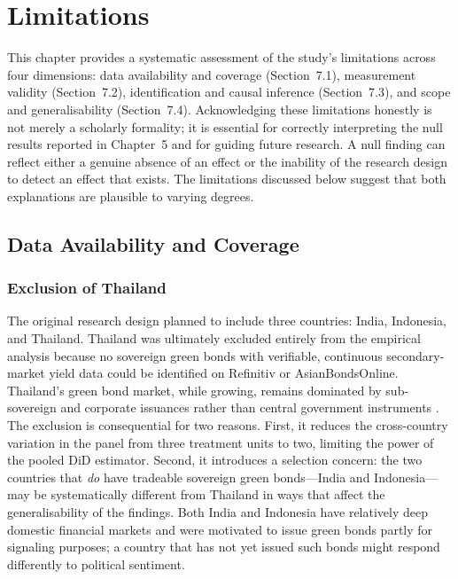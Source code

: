 \documentclass[12pt,a4paper]{article}
\begin{document}

\newpage
\setcounter{section}{6}
\section{Limitations}

This chapter provides a systematic assessment of the study's limitations across four dimensions: data availability and coverage (Section~7.1), measurement validity (Section~7.2), identification and causal inference (Section~7.3), and scope and generalisability (Section~7.4). Acknowledging these limitations honestly is not merely a scholarly formality; it is essential for correctly interpreting the null results reported in Chapter~5 and for guiding future research. A null finding can reflect either a genuine absence of an effect or the inability of the research design to detect an effect that exists. The limitations discussed below suggest that both explanations are plausible to varying degrees.

\subsection{Data Availability and Coverage}

\subsubsection{Exclusion of Thailand}

The original research design planned to include three countries: India, Indonesia, and Thailand. Thailand was ultimately excluded entirely from the empirical analysis because no sovereign green bonds with verifiable, continuous secondary-market yield data could be identified on Refinitiv or AsianBondsOnline. Thailand's green bond market, while growing, remains dominated by sub-sovereign and corporate issuances rather than central government instruments \citep{Panizza2025}. The exclusion is consequential for two reasons. First, it reduces the cross-country variation in the panel from three treatment units to two, limiting the power of the pooled DiD estimator. Second, it introduces a selection concern: the two countries that \textit{do} have tradeable sovereign green bonds---India and Indonesia---may be systematically different from Thailand in ways that affect the generalisability of the findings. Both India and Indonesia have relatively deep domestic financial markets and were motivated to issue green bonds partly for signaling purposes; a country that has not yet issued such bonds might respond differently to political sentiment.
\end{document}
